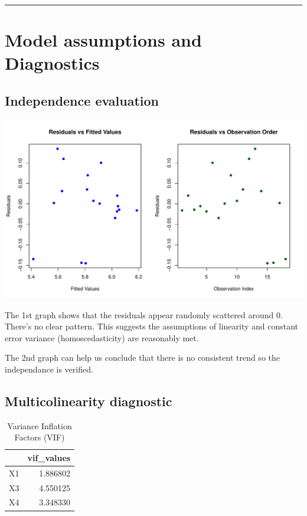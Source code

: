 \documentclass[
  11pt,
]{article}
\begin{document}
\begin{center}\rule{0.5\linewidth}{0.5pt}\end{center}

\section{Model assumptions and
Diagnostics}\label{model-assumptions-and-diagnostics}

\subsection{Independence evaluation}\label{independence-evaluation}

\includegraphics{Figs/unnamed-chunk-16-1.pdf}

The 1st graph shows that the residuals appear randomly scattered around
0. There's no clear pattern. This suggests the assumptions of linearity
and constant error variance (homoscedasticity) are reasonably met.

The 2nd graph can help us conclude that there is no consistent trend so
the independance is verified.

\subsection{Multicolinearity
diagnostic}\label{multicolinearity-diagnostic}

\begin{longtable}[t]{lr}
\caption{\label{tab:unnamed-chunk-17}Variance Inflation Factors (VIF)}\\
\toprule
 & vif\_values\\
\midrule
X1 & 1.886802\\
X3 & 4.550125\\
X4 & 3.348330\\
\bottomrule
\end{longtable}
\end{document}
